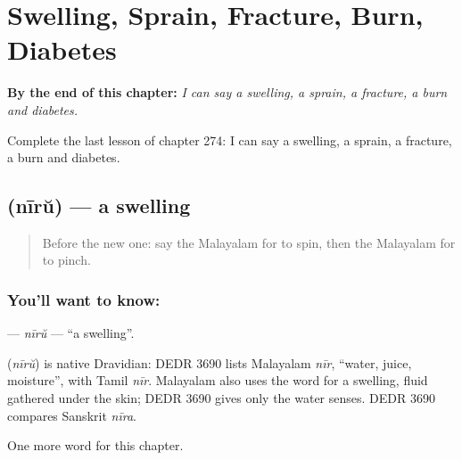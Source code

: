 
\chapter{Swelling, Sprain, Fracture, Burn, Diabetes}
\label{ch:ml-swelling-sprain-fracture-burn-diabetes}

\begin{chapteropening}
\textbf{By the end of this chapter:} \emph{I can say a swelling, a sprain, a fracture, a burn and diabetes.}

Complete the last lesson of chapter 274: I can say a swelling, a sprain, a fracture, a burn and diabetes.
\end{chapteropening}

\section[\texorpdfstring{\ml{നീര്} (nīrŭ)}{നീര് (nīrŭ)}]{ (nīrŭ) — a swelling}

\label{lesson:ML-C274-niru}



\begin{quote}
Before the new one: say the Malayalam for to spin, then the Malayalam for to pinch.
\end{quote}

\subsection*{You'll want to know: }
\textbf{} — \emph{nīrŭ} — \textquotedblleft{}a swelling\textquotedblright{}.

\begin{cousinweb}
\textbf{} (\emph{nīrŭ}) is native Dravidian: DEDR 3690 lists Malayalam \emph{nīr}, \textquotedblleft{}water, juice, moisture\textquotedblright{}, with Tamil \emph{nīr}. Malayalam also uses the word for a swelling, fluid gathered under the skin; DEDR 3690 gives only the water senses. DEDR 3690 compares Sanskrit \emph{nīra}.
\end{cousinweb}

\begin{grammarlens}[title={What you've built}]
One more word for this chapter.
\end{grammarlens}

